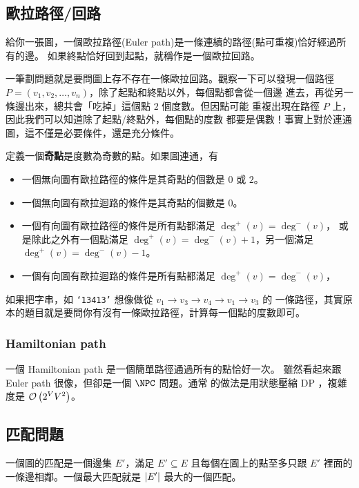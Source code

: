 \documentclass[a4paper,12pt]{book}
\begin{document}
\subsection{歐拉路徑/回路}
給你一張圖，一個歐拉路徑(Euler path)是一條連續的路徑(點可重複)恰好經過所有的邊。
如果終點恰好回到起點，就稱作是一個歐拉回路。

一筆劃問題就是要問圖上存不存在一條歐拉回路。觀察一下可以發現一個路徑
$P = (v_1, v_2, \dots, v_n)$，除了起點和終點以外，每個點都會從一個邊
進去，再從另一條邊出來，總共會「吃掉」這個點 $2$ 個度數。但因點可能
重複出現在路徑 $P$ 上，因此我們可以知道除了起點/終點外，每個點的度數
都要是偶數！事實上對於連通圖，這不僅是必要條件，還是充分條件。

\begin{theorem}
  定義一個{\bf 奇點}是度數為奇數的點。如果圖連通，有
  \begin{itemize}
    \item 一個無向圖有歐拉路徑的條件是其奇點的個數是 $0$ 或 $2$。
    \item 一個無向圖有歐拉迴路的條件是其奇點的個數是 $0$。
    \item 一個有向圖有歐拉路徑的條件是所有點都滿足 $\deg^+(v) = \deg^-(v)$，
      或是除此之外有一個點滿足 $\deg^+(v) = \deg^-(v) + 1$，另一個滿足
      $\deg^+(v) = \deg^-(v) - 1$。
    \item 一個有向圖有歐拉迴路的條件是所有點都滿足 $\deg^+(v) = \deg^-(v)$，
  \end{itemize}
\end{theorem}



如果把字串，如 \texttt{`13413'} 想像做從 $v_1 \to v_3 \to v_4 \to v_1 \to v_3$ 的
一條路徑，其實原本的題目就是要問你有沒有一條歐拉路徑，計算每一個點的度數即可。

\subsubsection{Hamiltonian path}
一個 Hamiltonian path 是一個簡單路徑通過所有的點恰好一次。
雖然看起來跟 Euler path 很像，但卻是一個 $\NPC$ 問題。通常
的做法是用狀態壓縮 DP ，複雜度是 $\operatorname{\mathcal{O}}\left(2^V V^2\right)$。


\subsection{匹配問題}
一個圖的匹配是一個邊集 $E'$，滿足 $E' \subseteq E$ 且每個在圖上的點至多只跟
$E'$ 裡面的一條邊相鄰。一個最大匹配就是 $\lvert E' \rvert$ 最大的一個匹配。
\end{document}
